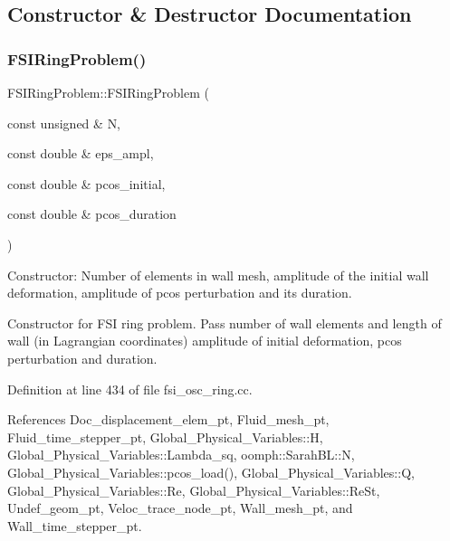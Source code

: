 \subsection{Constructor \& Destructor Documentation}
\mbox{\label{classFSIRingProblem_a8f4969c6397bebe8afa2b9285ec908e6}} 
\subsubsection{\texorpdfstring{F\+S\+I\+Ring\+Problem()}{FSIRingProblem()}\hspace{0.1cm}{\footnotesize\ttfamily [1/2]}}
{\footnotesize\ttfamily F\+S\+I\+Ring\+Problem\+::\+F\+S\+I\+Ring\+Problem (\begin{DoxyParamCaption}\item[{const unsigned \&}]{N,  }\item[{const double \&}]{eps\+\_\+ampl,  }\item[{const double \&}]{pcos\+\_\+initial,  }\item[{const double \&}]{pcos\+\_\+duration }\end{DoxyParamCaption})}

Constructor\+: Number of elements in wall mesh, amplitude of the initial wall deformation, amplitude of pcos perturbation and its duration.

Constructor for F\+SI ring problem. Pass number of wall elements and length of wall (in Lagrangian coordinates) amplitude of initial deformation, pcos perturbation and duration. 

Definition at line 434 of file fsi\+\_\+osc\+\_\+ring.\+cc.



References Doc\+\_\+displacement\+\_\+elem\+\_\+pt, Fluid\+\_\+mesh\+\_\+pt, Fluid\+\_\+time\+\_\+stepper\+\_\+pt, Global\+\_\+\+Physical\+\_\+\+Variables\+::H, Global\+\_\+\+Physical\+\_\+\+Variables\+::\+Lambda\+\_\+sq, oomph\+::\+Sarah\+B\+L\+::N, Global\+\_\+\+Physical\+\_\+\+Variables\+::pcos\+\_\+load(), Global\+\_\+\+Physical\+\_\+\+Variables\+::Q, Global\+\_\+\+Physical\+\_\+\+Variables\+::\+Re, Global\+\_\+\+Physical\+\_\+\+Variables\+::\+Re\+St, Undef\+\_\+geom\+\_\+pt, Veloc\+\_\+trace\+\_\+node\+\_\+pt, Wall\+\_\+mesh\+\_\+pt, and Wall\+\_\+time\+\_\+stepper\+\_\+pt.

